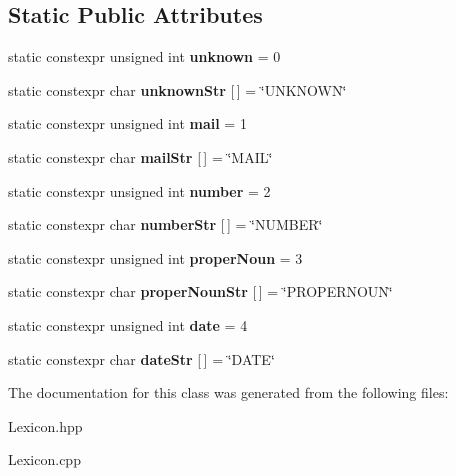 \subsection*{Static Public Attributes}
\begin{DoxyCompactItemize}
\item 
\mbox{\label{classLexicon_a59a48310a9dd34ca9dcd80d4ff047531}} 
static constexpr unsigned int {\bfseries unknown} = 0
\item 
\mbox{\label{classLexicon_a4c4bf4e37c916cccd9adaeb228429330}} 
static constexpr char {\bfseries unknown\+Str} \mbox{[}$\,$\mbox{]} = \char`\"{}U\+N\+K\+N\+O\+WN\char`\"{}
\item 
\mbox{\label{classLexicon_a1dae4cf53e7c6343d3fe95d8754fee61}} 
static constexpr unsigned int {\bfseries mail} = 1
\item 
\mbox{\label{classLexicon_a8e9965925b7ab956f4b0e6f82af4fcd8}} 
static constexpr char {\bfseries mail\+Str} \mbox{[}$\,$\mbox{]} = \char`\"{}M\+A\+IL\char`\"{}
\item 
\mbox{\label{classLexicon_a09c4d8bad7b44b9fce78f21aafd0e4d0}} 
static constexpr unsigned int {\bfseries number} = 2
\item 
\mbox{\label{classLexicon_a39ff54ee2e7b5e6f523992ad92f30d6e}} 
static constexpr char {\bfseries number\+Str} \mbox{[}$\,$\mbox{]} = \char`\"{}N\+U\+M\+B\+ER\char`\"{}
\item 
\mbox{\label{classLexicon_ae796dbdb68e1a4758a9d40998bf40833}} 
static constexpr unsigned int {\bfseries proper\+Noun} = 3
\item 
\mbox{\label{classLexicon_a9cf65fdf5226cc21152c3dd28c4a6fa4}} 
static constexpr char {\bfseries proper\+Noun\+Str} \mbox{[}$\,$\mbox{]} = \char`\"{}P\+R\+O\+P\+E\+R\+N\+O\+UN\char`\"{}
\item 
\mbox{\label{classLexicon_a1e8cf6d17dea0480adbdb1f08f6c1167}} 
static constexpr unsigned int {\bfseries date} = 4
\item 
\mbox{\label{classLexicon_aa4457caaac6b659b7aeb8b40490a4438}} 
static constexpr char {\bfseries date\+Str} \mbox{[}$\,$\mbox{]} = \char`\"{}D\+A\+TE\char`\"{}
\end{DoxyCompactItemize}


The documentation for this class was generated from the following files\+:\begin{DoxyCompactItemize}
\item 
Lexicon.\+hpp\item 
Lexicon.\+cpp\end{DoxyCompactItemize}
